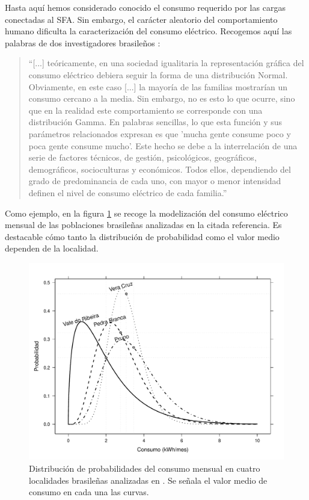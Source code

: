 Hasta aquí hemos considerado conocido el consumo requerido por las
cargas conectadas al SFA. Sin embargo, el carácter aleatorio del comportamiento
humano dificulta la caracterización del consumo eléctrico. Recogemos
aquí las palabras de dos investigadores brasileños \cite{Morante.Zilles2008}:
\begin{quotation}
{}``{[}...{]} teóricamente, en una sociedad igualitaria la representación
gráfica del consumo eléctrico debiera seguir la forma de una distribución
Normal. Obviamente, en este caso {[}...{]} la mayoría de las familias
mostrarían un consumo cercano a la media. Sin embargo, no es esto
lo que ocurre, sino que en la realidad este comportamiento se corresponde
con una distribución Gamma. En palabras sencillas, lo que esta función
y sus parámetros relacionados expresan es que 'mucha gente consume
poco y poca gente consume mucho'. Este hecho se debe a la interrelación
de una serie de factores técnicos, de gestión, psicológicos, geográficos,
demográficos, socioculturas y económicos. Todos ellos, dependiendo
del grado de predominancia de cada uno, con mayor o menor intensidad
definen el nivel de consumo eléctrico de cada familia.''
\end{quotation}
Como ejemplo, en la figura \ref{fig:Distribucion-de-probabilidades}
se recoge la modelización del consumo eléctrico mensual de las poblaciones
brasileñas analizadas en la citada referencia. Es destacable cómo
tanto la distribución de probabilidad como el valor medio dependen
de la localidad. 

%
\begin{figure}
\includegraphics[scale=0.6]{../figs/ConsumoGamma}

\caption[Distribución de probabilidades del consumo mensual en cuatro localidades
brasileñas]{\label{fig:Distribucion-de-probabilidades}Distribución de probabilidades
del consumo mensual en cuatro localidades brasileñas analizadas en
\cite{Morante.Zilles2008}. Se señala el valor medio de consumo en
cada una las curvas. }



\end{figure}


